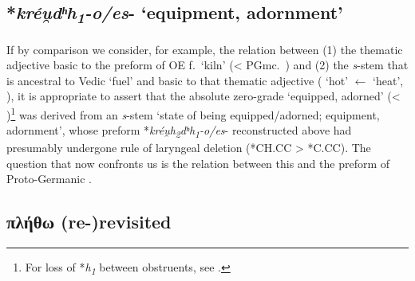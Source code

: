 \documentclass[output=paper,colorlinks,citecolor=brown]{langscibook}
\begin{document}
\subsection{*\textit{kréu̯dʰh\textsubscript{1}-o/es}- ‘equipment, adornment’}

If by comparison we consider, for example, the relation between (1) the thematic adjective basic to the preform of OE  f.\ ‘kiln’ (< PGmc.\ ) and (2) the \textit{s}-stem that is ancestral to Vedic  ‘fuel’ and basic to that thematic adjective ( ‘hot’ $\leftarrow$  ‘heat’, \citealt[527]{Nussbaum1998}), it is appropriate to assert that the absolute zero-grade  ‘equipped, adorned’ (< )\footnote{For loss of *\textit{h\textsubscript{1}} between obstruents, see \citealt[77]{Jasanoff2003}.} was derived from an \textit{s}-stem  ‘state of being equipped/adorned; equipment, adornment’, whose preform *\textit{kréu̯h\textsubscript{2}dʰh\textsubscript{1}-o/es}- reconstructed above had presumably undergone  rule of laryngeal deletion (*CH.CC > *C.CC). The question that now confronts us is the relation between this  and the preform of Proto-Germanic .

\subsection{πλήθω (re-)revisited}
\end{document}
